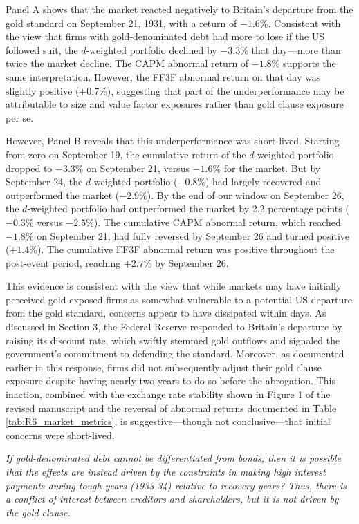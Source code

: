 Panel A shows that the market reacted negatively to Britain's departure from the gold standard on September 21, 1931, with a return of $-1.6\%$. Consistent with the view that firms with gold-denominated debt had more to lose if the US followed suit, the $d$-weighted portfolio declined by $-3.3\%$ that day---more than twice the market decline. The CAPM abnormal return of $-1.8\%$ supports the same interpretation. However, the FF3F abnormal return on that day was slightly positive ($+0.7\%$), suggesting that part of the underperformance may be attributable to size and value factor exposures rather than gold clause exposure per se.

However, Panel B reveals that this underperformance was short-lived. Starting from zero on September 19, the cumulative return of the $d$-weighted portfolio dropped to $-3.3\%$ on September 21, versus $-1.6\%$ for the market. But by September 24, the $d$-weighted portfolio ($-0.8\%$) had largely recovered and outperformed the market ($-2.9\%$). By the end of our window on September 26, the $d$-weighted portfolio had outperformed the market by 2.2 percentage points ($-0.3\%$ versus $-2.5\%$). The cumulative CAPM abnormal return, which reached $-1.8\%$ on September 21, had fully reversed by September 26 and turned positive ($+1.4\%$). The cumulative FF3F abnormal return was positive throughout the post-event period, reaching $+2.7\%$ by September 26.

This evidence is consistent with the view that while markets may have initially perceived gold-exposed firms as somewhat vulnerable to a potential US departure from the gold standard, concerns appear to have dissipated within days. As discussed in Section 3, the Federal Reserve responded to Britain's departure by raising its discount rate, which swiftly stemmed gold outflows and signaled the government's commitment to defending the standard. Moreover, as documented earlier in this response, firms did not subsequently adjust their gold clause exposure despite having nearly two years to do so before the abrogation. This inaction, combined with the exchange rate stability shown in Figure 1 of the revised manuscript and the reversal of abnormal returns documented in Table \ref{tab:R6_market_metrics}, is suggestive---though not conclusive---that initial concerns were short-lived. 

\bigskip

\textit{\textcolor{red!60!black}{
If gold-denominated debt cannot be differentiated from bonds, then it is possible that the effects are instead driven by the constraints in making high interest payments during tough years (1933-34) relative to recovery years? Thus, there is a conflict of interest between creditors and shareholders, but it is not driven by the gold clause.
}}

